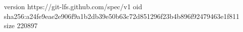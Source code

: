 version https://git-lfs.github.com/spec/v1
oid sha256:a24fe9eae2e906f9a1b2db39e50b63c72d851296f23b4b896f92479463e1f811
size 220897
